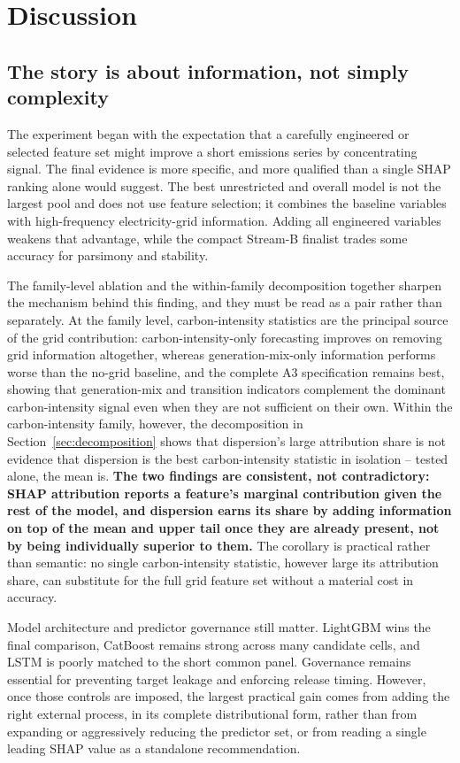 \documentclass[preprint,12pt]{elsarticle}
\begin{document}
\section{Discussion}\label{sec:discussion}

\subsection{The story is about information, not simply complexity}

The experiment began with the expectation that a carefully engineered or selected feature set might improve a short emissions series by concentrating signal. The final evidence is more specific, and more qualified than a single SHAP ranking alone would suggest. The best unrestricted and overall model is not the largest pool and does not use feature selection; it combines the baseline variables with high-frequency electricity-grid information. Adding all engineered variables weakens that advantage, while the compact Stream-B finalist trades some accuracy for parsimony and stability.

The family-level ablation and the within-family decomposition together sharpen the mechanism behind this finding, and they must be read as a pair rather than separately. At the family level, carbon-intensity statistics are the principal source of the grid contribution: carbon-intensity-only forecasting improves on removing grid information altogether, whereas generation-mix-only information performs worse than the no-grid baseline, and the complete A3 specification remains best, showing that generation-mix and transition indicators complement the dominant carbon-intensity signal even when they are not sufficient on their own. Within the carbon-intensity family, however, the decomposition in Section~\ref{sec:decomposition} shows that dispersion's large attribution share is not evidence that dispersion is the best carbon-intensity statistic in isolation -- tested alone, the mean is. \textbf{The two findings are consistent, not contradictory: SHAP attribution reports a feature's marginal contribution given the rest of the model, and dispersion earns its share by adding information on top of the mean and upper tail once they are already present, not by being individually superior to them.} The corollary is practical rather than semantic: no single carbon-intensity statistic, however large its attribution share, can substitute for the full grid feature set without a material cost in accuracy.

Model architecture and predictor governance still matter. LightGBM wins the final comparison, CatBoost remains strong across many candidate cells, and LSTM is poorly matched to the short common panel. Governance remains essential for preventing target leakage and enforcing release timing. However, once those controls are imposed, the largest practical gain comes from adding the right external process, in its complete distributional form, rather than from expanding or aggressively reducing the predictor set, or from reading a single leading SHAP value as a standalone recommendation.
\end{document}

